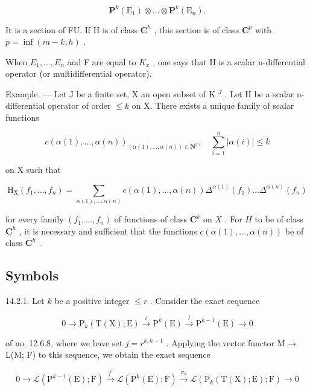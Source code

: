 \[
\mathbf {P} ^ {k} (\mathrm{E} _ {1}) \otimes \dots \otimes \mathbf {P} ^ {k} (\mathrm{E} _ {n}).
\]

It is a section of F\textbar U. If H is of class \(\mathbf{C}^h\) , this section is of class \(\mathbf{C}^p\) with \(p = \inf(m - k, h)\) .

When \(E_{1}, \ldots, E_{n}\) and F are equal to \(K_{x}\) , one says that H is a scalar n-differential operator (or multidifferential operator).

Example. --- Let J be a finite set, X an open subset of K \(^{J}\) . Let H be a scalar n-differential operator of order \(\leqslant k\) on X. There exists a unique family of scalar functions

\[
c (\alpha (1), \dots , \alpha (n)) _ {(\alpha (1), \dots , \alpha (n)) \in \mathbf {N} ^ {\mathrm{J}}}, \quad \sum_ {i = 1} ^ {n} | \alpha (i) | \leqslant k
\]

on X such that

\[
\mathrm{H} _ {\mathrm{X}} \left(f _ {1}, \dots , f _ {n}\right) = \sum_ {\alpha (1), \dots , \alpha (n)} c (\alpha (1), \dots , \alpha (n)) \Delta^ {\alpha (1)} \left(f _ {1}\right) \dots \Delta^ {\alpha (n)} \left(f _ {n}\right)
\]

for every family \((f_1, \ldots, f_n)\) of functions of class \(\mathbf{C}^k\) on \(X\) . For \(H\) to be of class \(\mathbf{C}^h\) , it is necessary and sufficient that the functions \(c(\alpha(1), \ldots, \alpha(n))\) be of class \(\mathbf{C}^h\) .

\subsection{Symbols}

14.2.1. Let \(k\) be a positive integer \(\leqslant r\) . Consider the exact sequence

\[
0 \rightarrow \mathrm{P} _ {k} (\mathrm{T} (\mathrm{X}); \mathrm{E}) \xrightarrow {\iota} \mathrm{P} ^ {k} (\mathrm{E}) \xrightarrow {\jmath} \mathrm{P} ^ {k - 1} (\mathrm{E}) \rightarrow 0
\]

of no. 12.6.8, where we have set \(j = r^{k, k-1}\) . Applying the vector functor M → L(M; F) to this sequence, we obtain the exact sequence

\[
0 \rightarrow \mathscr {L} (\mathrm{P} ^ {k - 1} (\mathrm{E}); \mathrm{F}) \xrightarrow {f ^ {\prime}} \mathscr {L} (\mathrm{P} ^ {k} (\mathrm{E}); \mathrm{F}) \xrightarrow {\sigma_ {k}} \mathscr {L} (\mathrm{P} _ {k} (\mathrm{T} (\mathrm{X}); \mathrm{E}); \mathrm{F}) \rightarrow 0
\]

